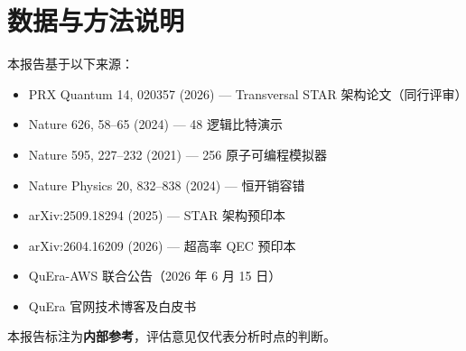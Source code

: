 \documentclass[11pt,a4paper]{ctexart}
\begin{document}
\section*{数据与方法说明}
本报告基于以下来源：
\begin{itemize}
\item PRX Quantum 14, 020357 (2026) --- Transversal STAR 架构论文（同行评审）
\item Nature 626, 58--65 (2024) --- 48 逻辑比特演示
\item Nature 595, 227--232 (2021) --- 256 原子可编程模拟器
\item Nature Physics 20, 832--838 (2024) --- 恒开销容错
\item arXiv:2509.18294 (2025) --- STAR 架构预印本
\item arXiv:2604.16209 (2026) --- 超高率 QEC 预印本
\item QuEra-AWS 联合公告（2026 年 6 月 15 日）
\item QuEra 官网技术博客及白皮书
\end{itemize}
本报告标注为\textbf{内部参考}，评估意见仅代表分析时点的判断。
\end{document}
